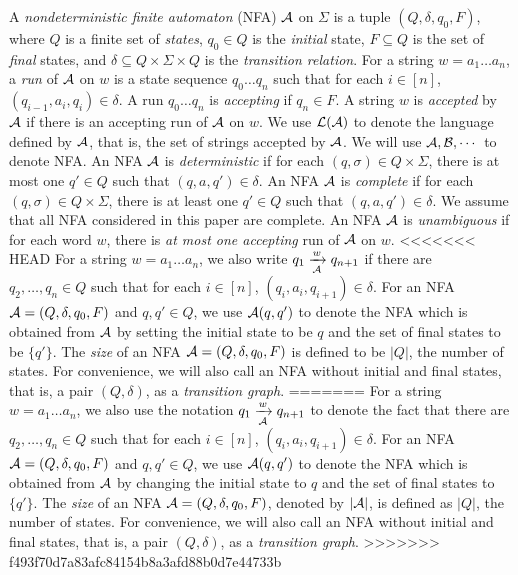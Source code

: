 A \emph{nondeterministic finite automaton} (NFA) $\mathcal{A}$ on $\Sigma$ is a tuple $(Q, \delta, q_0, F)$, where $Q$ is a finite set of \emph{states}, $q_0 \in Q$ is the \emph{initial} state, $F \subseteq Q$ is the set of \emph{final} states, and $\delta \subseteq Q \times \Sigma \times Q$ is the \emph{transition relation}. For a string $w = a_1 \dots a_n$, a \emph{run} of $\mathcal{A}$ on $w$ is a state sequence $q_0 \dots q_n$ such that for each $i \in [n]$, $(q_{i-1}, a_i, q_i) \in \delta$. A run $q_0 \dots q_n$ is \emph{accepting} if $q_n \in F$. A string $w$ is \emph{accepted} by $\mathcal{A}$ if there is an accepting run of $\mathcal{A}$ on $w$. We use $\mathcal{L}(\mathcal{A})$ to denote the language defined by $\mathcal{A}$, that is, the set of strings accepted by $\mathcal{A}$. We will use $\mathcal{A}, \mathcal{B}, \cdots$ to denote NFA. An NFA $\mathcal{A}$ is \emph{deterministic} if for each $(q, \sigma) \in Q \times \Sigma$, there is at most one $q' \in Q$ such that $(q, a, q') \in \delta$. An NFA $\mathcal{A}$ is \emph{complete} if for each $(q, \sigma) \in Q \times \Sigma$, there is at least one $q' \in Q$ such that $(q, a, q') \in \delta$. We assume that all NFA considered in this paper are complete.  An NFA $\mathcal{A}$ is \emph{unambiguous} if for each word $w$, there is \emph{at most one accepting} run of $\mathcal{A}$ on $w$.
<<<<<<< HEAD
For a string $w= a_1 \dots a_n$, we also write $q_1 \xrightarrow[\mathcal{A}]{w} q_{n+1}$ if there are $q_2,\dots, q_n \in Q$ such that for each $i \in [n]$, $(q_i, a_i, q_{i+1}) \in \delta$.  For an NFA $\mathcal{A}=(Q, \delta, q_0, F)$ and $q, q' \in Q$, we use $\mathcal{A}(q,q')$ to denote the NFA which is obtained from $\mathcal{A}$ by setting the initial state to be $q$ and the set of final states to be $\{q'\}$. The \emph{size} of an NFA $\mathcal{A}=(Q, \delta, q_0, F)$ is defined to be $|Q|$, the number of states. For convenience, we will also call an NFA without initial and final states, that is, a pair $(Q, \delta)$, as a \emph{transition graph}.
=======
For a string $w= a_1 \dots a_n$, we also use the notation $q_1 \xrightarrow[\mathcal{A}]{w} q_{n+1}$ to denote the fact that there are $q_2,\dots, q_n \in Q$ such that for each $i \in [n]$, $(q_i, a_i, q_{i+1}) \in \delta$.  For an NFA $\mathcal{A}=(Q, \delta, q_0, F)$ and $q, q' \in Q$, we use $\mathcal{A}(q,q')$ to denote the NFA which is obtained from $\mathcal{A}$ by changing the initial state to $q$ and the set of final states to $\{q'\}$. The \emph{size} of an NFA $\mathcal{A}=(Q, \delta, q_0, F)$, denoted by $|\mathcal{A}|$, is defined as $|Q|$, the number of states. For convenience, we will also call an NFA without initial and final states, that is, a pair $(Q, \delta)$, as a \emph{transition graph}. 
>>>>>>> f493f70d7a83afc84154b8a3afd88b0d7e44733b

